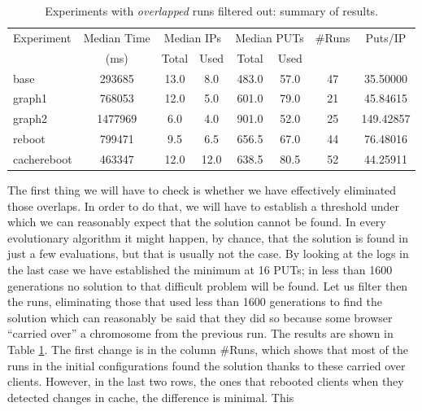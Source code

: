 \documentclass[runningheads,a4paper]{llncs}\usepackage[]{graphicx}\usepackage[]{color}
\begin{document}
%
\begin{table}
  \caption{Experiments with {\em overlapped} runs filtered out: summary of results. \label{tab:filtered}}
\begin{center}
\begin{tabular}{|l|c|c|c|c|c|c|c|}
\hline
Experiment & Median Time & \multicolumn{2}{|c|}{Median IPs} &\multicolumn{2}{|c|}{Median PUTs} & \#Runs &  Puts/IP \\
&   (ms)        & Total & Used & Total & Used &  & \\
\hline
base & 293685 & 13.0 & 8.0 & 483.0 & 57.0 & 47 & 35.50000\\
\hline
graph1 & 768053 & 12.0 & 5.0 & 601.0 & 79.0 & 21 & 45.84615\\
graph2 & 1477969 & 6.0 & 4.0 & 901.0 & 52.0 & 25 & 149.42857\\
\hline
reboot & 799471 & 9.5 & 6.5 & 656.5 & 67.0 & 44 & 76.48016\\
\hline
cachereboot & 463347 & 12.0 & 12.0 & 638.5 & 80.5 & 52 & 44.25911\\
\hline
\end{tabular}
%
\end{center}
\end{table}
%
The first thing we will have to check is whether we have effectively eliminated those
overlaps. In order to do that, we will have to establish a threshold
under which we can reasonably expect that the solution cannot be found. In every
evolutionary algorithm it might happen, by chance, that the solution
is found in just a few evaluations, but that is usually not the
case. By looking at the logs in the last case we have established the
minimum at 16 PUTs; in less than 1600 generations no solution to that
difficult problem will be found. %
 Let us filter then the runs,
eliminating those that used less than 1600 generations to find the
solution which can reasonably be said that they did so because some
browser ``carried over'' a chromosome from the previous run. The
results are shown in Table \ref{tab:filtered}. The first change is in
the column \#Runs, which shows that most of the runs in the initial
configurations found the solution thanks to these carried over
clients. However, in the last two rows, the ones that rebooted clients
when they detected changes in cache, the difference is minimal. This
\end{document}
